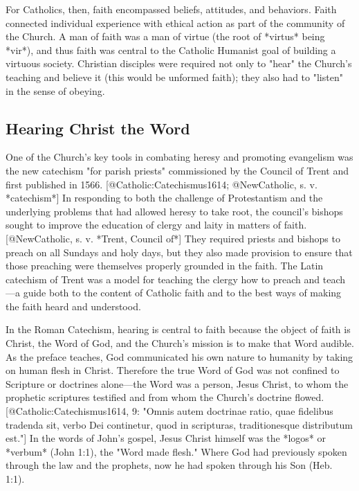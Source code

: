 For Catholics, then, faith encompassed beliefs, attitudes, and behaviors.
Faith connected individual experience with ethical action as part of the
community of the Church. 
A man of faith was a man of virtue (the root of *virtus* being *vir*), and thus
faith was central to the Catholic Humanist goal of building a virtuous society.
Christian disciples were required not only to "hear" the Church's teaching and
believe it (this would be unformed faith); they also had to "listen" in the
sense of obeying. 


\subsection{Hearing Christ the Word}


One of the Church's key tools in combating heresy and promoting evangelism was
the new catechism "for parish priests" commissioned by the Council of Trent and
first published in 1566.
[@Catholic:Catechismus1614; @NewCatholic, s. v.  *catechism*]
In responding to both the challenge of Protestantism and the underlying problems
that had allowed heresy to take root, the council's bishops sought to improve
the education of clergy and laity in matters of faith.
[@NewCatholic, s. v.  *Trent, Council of*]
They required priests and bishops to preach on all Sundays and holy days, but
they also made provision to ensure that those preaching were themselves properly
grounded in the faith.
The Latin catechism of Trent was a model for teaching the clergy how to preach
and teach---a guide both to the content of Catholic faith and to the best ways
of making the faith heard and understood. 

In the Roman Catechism, hearing is central to faith because the object of faith
is Christ, the Word of God, and the Church's mission is to make that Word
audible. 
As the preface teaches, God communicated his own nature to humanity by taking on
human flesh in Christ. 
Therefore the true Word of God was not confined to Scripture or doctrines
alone---the Word was a person, Jesus Christ, to whom the prophetic scriptures
testified and from whom the Church's doctrine flowed.
[@Catholic:Catechismus1614, 9: 
"Omnis autem doctrinae ratio, quae fidelibus tradenda sit, verbo Dei
continetur, quod in scripturas, traditionesque distributum est."]
In the words of John's gospel, Jesus Christ himself was the *logos* or *verbum*
(John 1:1), the "Word made flesh." 
Where God had previously spoken through the law and the prophets, now he had
spoken through his Son (Heb. 1:1). 

